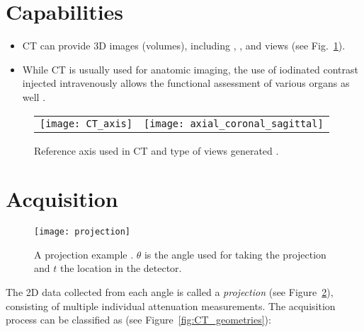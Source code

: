 \section{Capabilities}
\begin{itemize}
\item CT can provide  3D images (volumes), including
  , , and 
  views (see Fig.~\ref{fig:views_in_CT}).
\item While CT is usually used for anatomic imaging, the use of
  iodinated contrast injected intravenously allows the functional
  assessment of various organs as well \cite{bushberg2011essential}.
\end{itemize}
\begin{figure}
  \centering
  \begin{tabular}{cc}
    \texttt{[image: CT\_axis]} & \texttt{[image: axial\_coronal\_sagittal]}
  \end{tabular}
  \caption{Reference axis used in CT and type of views generated \cite{morin2025radiation}.\label{fig:views_in_CT}}
\end{figure}


\section{Acquisition}

\begin{figure}
  \centering
  \texttt{[image: projection]}
  \caption{A projection example \cite{takase2025CT}. $\theta$ is the
    angle used for taking the projection and $t$ the location in
    the detector.\label{fig:projection}}
\end{figure}

The 2D data collected from each angle is called a \emph{projection}
(see Figure~\ref{fig:projection}), consisting of multiple individual
attenuation measurements. The acquisition process can be classified as
(see Figure~\ref{fig:CT_geometries}):

